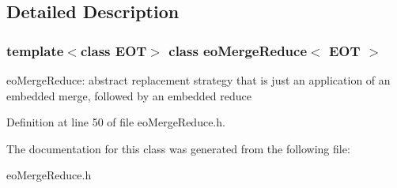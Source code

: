 \subsection{Detailed Description}
\subsubsection*{template$<$class EOT$>$ class eo\-Merge\-Reduce$<$ EOT $>$}

eo\-Merge\-Reduce: abstract replacement strategy that is just an application of an embedded merge, followed by an embedded reduce 



Definition at line 50 of file eo\-Merge\-Reduce.h.

The documentation for this class was generated from the following file:\begin{CompactItemize}
\item 
eo\-Merge\-Reduce.h\end{CompactItemize}
